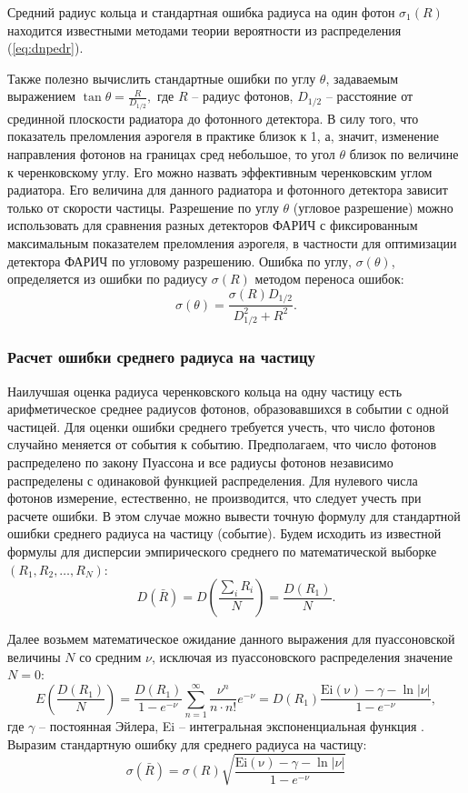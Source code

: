 \documentclass[12pt]{article}
\begin{document}
Средний радиус кольца и стандартная ошибка радиуса на один фотон $\sigma_1(R)$ находится известными методами теории вероятности из распределения (\ref{eq:dnpedr}).

Также полезно вычислить стандартные ошибки по углу $\theta$, задаваемым выражением 
\(\tan\theta = \frac{R}{D_{1/2}},\)
где $R$ -- радиус фотонов, $D_{1/2}$ -- расстояние от срединной плоскости радиатора до фотонного детектора.
В силу того, что показатель преломления аэрогеля в практике близок к 1, а, значит, изменение направления фотонов на границах сред небольшое, то 
угол $\theta$ близок по величине к черенковскому углу. Его можно назвать эффективным черенковским углом радиатора. Его величина для данного радиатора и фотонного детектора
зависит только от скорости частицы. Разрешение по углу $\theta$ (угловое разрешение) можно использовать для сравнения разных детекторов ФАРИЧ с фиксированным максимальным 
показателем преломления аэрогеля, в частности для оптимизации детектора ФАРИЧ по угловому разрешению.
Ошибка по углу, $\sigma(\theta)$, определяется из ошибки по радиусу $\sigma(R)$ методом переноса ошибок:
\[\sigma(\theta) = \frac{\sigma(R) D_{1/2}}{D_{1/2}^2+R^2}.\]

\subsubsection*{Расчет ошибки среднего радиуса на частицу}
Наилучшая оценка радиуса черенковского кольца на одну частицу есть арифметическое среднее радиусов фотонов, образовавшихся в событии с одной частицей. 
Для оценки ошибки среднего требуется учесть, что число фотонов случайно меняется от события к событию. Предполагаем, что число фотонов
распределено по закону Пуассона и все радиусы фотонов независимо распределены с одинаковой функцией распределения. Для нулевого числа фотонов 
измерение, естественно, не производится, что следует учесть при расчете ошибки. 
В этом случае  можно вывести точную формулу для стандартной ошибки среднего радиуса на частицу (событие).
Будем исходить из известной формулы для дисперсии эмпирического среднего по математической выборке $(R_1, R_2, \ldots, R_N)$:
\[\displaystyle D(\bar{R}) = D\left(\frac{\sum_i R_i}{N}\right) = \frac{D(R_1)}{N}.\]

Далее возьмем математическое ожидание данного выражения для пуассоновской величины $N$ со средним $\nu$, исключая из пуассоновского распределения
значение $N=0$:
\[
E\left(\frac{D(R_1)}{N}\right) = \frac{D(R_1)}{1-e^{-\nu}} \sum_{n=1}^{\infty} \frac{\nu^n}{n\cdot n!} e^{-\nu} = D(R_1) \frac{\mathrm{Ei(\nu)}-\gamma-\ln|\nu|}{1-e^{-\nu}},
\]
где $\gamma$ -- постоянная Эйлера, Ei -- интегральная экспоненциальная функция \cite{prudn}. Выразим стандартную ошибку для среднего радиуса на частицу:
\begin{equation}
\sigma(\bar{R}) = \sigma(R) \sqrt{\frac{\mathrm{Ei(\nu)}-\gamma-\ln|\nu|}{1-e^{-\nu}}}
\label{eq:sigmean}
\end{equation}
\end{document}
